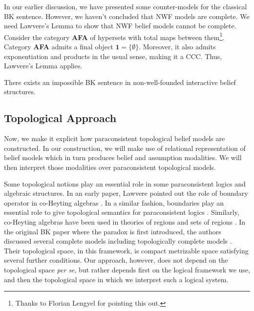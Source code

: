 \documentclass{article}
\begin{document}
In our earlier discussion, we have presented some counter-models for the classical BK sentence. However, we haven't concluded that NWF models are complete. We need Lawvere's Lemma to show that NWF belief models cannot be complete. Consider the category \textbf{AFA} of hypersets with total maps between them\footnote{Thanks to Florian Lengyel for pointing this out.}. Category \textbf{AFA} admits a final object $\mathbf{1} = \{ \emptyset \}$. Moreover, it also admits exponentiation and products in the usual sense, making it a CCC. Thus, Lawvere's Lemma applies.

\begin{cor}
There exists an impossible BK sentence in non-well-founded interactive belief structures.
\end{cor}

\subsection{Topological Approach}

Now, we make it explicit how paraconsistent topological belief models are constructed. In our construction, we will make use of relational representation of belief models which in turn produces belief and assumption modalities. We will then interpret those modalities over paraconsistent topological models.

Some topological notions play an essential role in some paraconsistent logics and algebraic structures. In an early paper, Lawvere pointed out the role of boundary operator in co-Heyting algebras \cite{law}. In a similar fashion, boundaries play an essential role to give topological semantics for paraconsistent logics \cite{good,mor,bas3}. Similarly, co-Heyting algebras have been used in theories of regions and sets of regions \cite{ste2}. In the original BK paper where the paradox is first introduced, the authors discussed several complete models including topologically complete models \cite{bran0}. Their topological space, in this framework, is compact metrizable space satisfying several further conditions. Our approach, however, does not depend on the topological space \emph{per se}, but rather depends first on the logical framework we use, and then the topological space in which we interpret such a logical system.
\end{document}
